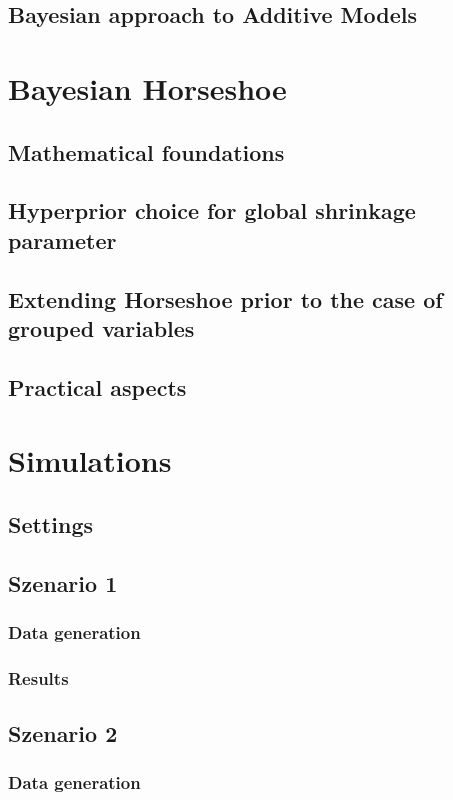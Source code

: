 \documentclass[12pt,letterpaper]{article}
\begin{document}
\label{sec:HMC}
\subsection{Bayesian approach to Additive Models}
\label{sec:AddMod}
\pagebreak

\section{Bayesian Horseshoe}
\subsection{Mathematical foundations}
\subsection{Hyperprior choice for global shrinkage parameter}
\subsection{Extending Horseshoe prior to the case of grouped variables}
\label{sec:gHSP}
\subsection{Practical aspects}
\pagebreak

\section{Simulations}
\subsection{Settings}

\subsection{Szenario 1}
\subsubsection{Data generation}
\subsubsection{Results}
\subsection{Szenario 2}
\subsubsection{Data generation}
\end{document}
